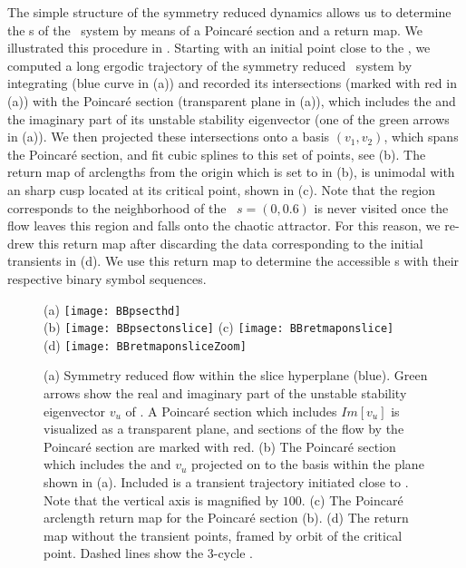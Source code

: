 The simple structure of the symmetry reduced dynamics allows us to determine the 
\rpo s of the \twomode\ system by means of a Poincar\'e section and a return map. We illustrated this procedure in . Starting with an initial
point close to the \REQV{}{}, we computed a long ergodic trajectory of the symmetry reduced \twomode\ system by integrating  (blue curve in  (a)) and recorded its intersections (marked with red in  (a)) with the Poincar\'e section (transparent plane in  (a)), which includes the \REQV{}{} and the imaginary part of its unstable stability eigenvector (one of the green arrows in  (a)). We then projected these intersections onto a
basis $(v_1, v_2)$, which spans the Poincar\'e section, and fit cubic splines to this set of points, see  (b). The return map of arclengths from the origin which is set to \REQV{}{} in  (b), is unimodal with an sharp cusp located at its critical point, shown in  (c). Note that the region corresponds to the neighborhood of the \reqv\ $s = (0, 0.6)$ is never visited once the flow leaves this region and falls onto the chaotic attractor. For this reason, we re-drew this return map after discarding the data corresponding to the initial transients in  (d). We use this return map to determine the accessible \rpo s  with their respective binary symbol sequences.

\begin{figure}
\centering
  (a) \texttt{[image: BBpsecthd]} \\
  (b) \texttt{[image: BBpsectonslice]}
  (c) \texttt{[image: BBretmaponslice]} \\
  (d) \texttt{[image: BBretmaponsliceZoom]}
\caption{(a) Symmetry reduced flow within the slice hyperplane (blue).
			Green arrows show the real and imaginary part of the unstable stability
			eigenvector $v_u$ of \REQV{}{}. A Poincar\'e section which includes
			$Im[v_u]$ is visualized as a transparent plane, and sections
			of the flow by the Poincar\'e section are marked with red.
		 (b) The Poincar\'e section which includes the \REQV{}{} and $v_u$ projected
			on to the basis within the plane shown in (a). Included is a
            transient trajectory initiated close to \REQV{}{}. Note that
		  	the vertical axis is magnified by $100$.
		 (c) The Poincar\'e arclength return map for the
		    Poincar\'e section (b).
		 (d) The return map without the transient points, framed by
            orbit of the critical point.
		 	Dashed lines show the 3-cycle .}
\label{fig:psectandretmap}
\end{figure}